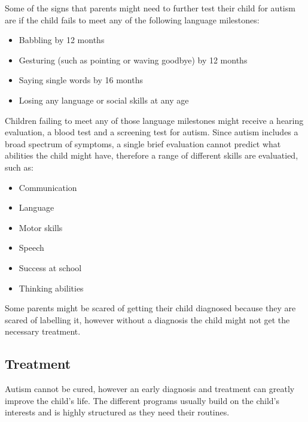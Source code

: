 Some of the signs that parents might need to further test their child for autism are if the child fails to meet any of the following language milestones:

\begin{itemize}
\item Babbling by 12 months
\item Gesturing (such as pointing or waving goodbye) by 12 months
\item Saying single words by 16 months
\item Losing any language or social skills at any age
\end{itemize}

Children failing to meet any of those language milestones might receive a hearing evaluation, a blood test and a screening test for autism. Since autism includes a broad spectrum of symptoms, a single brief evaluation cannot predict what abilities the child might have, therefore a range of different skills are evaluatied, such as:

\begin{itemize}
\item Communication
\item Language
\item Motor skills
\item Speech
\item Success at school
\item Thinking abilities
\end{itemize}

Some parents might be scared of getting their child diagnosed because they are scared of labelling it, however without a diagnosis the child might not get the necessary treatment. 

\subsection*{Treatment}

Autism cannot be cured, however an early diagnosis and treatment can greatly improve the child's life. The different programs usually build on the child's interests and is highly structured as they need their routines. 